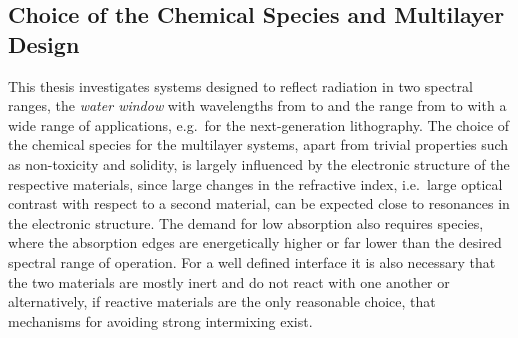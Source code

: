 \subsection{Choice of the Chemical Species and Multilayer Design}
\label{ch_exp:sec_multilayer_design}
This thesis investigates systems designed to reflect radiation in two spectral ranges, the \emph{water window} with wavelengths from  to  and the range from  to  with a wide range of applications, e.g.~for the next-generation lithography. The choice of the chemical species for the multilayer systems, apart from trivial properties such as non-toxicity and solidity, is largely influenced by the electronic structure of the respective materials, since large changes in the refractive index, i.e.~large optical contrast with respect to a second material, can be expected close to resonances in the electronic structure. The demand for low absorption also requires species, where the absorption edges are energetically higher or far lower than the desired spectral range of operation. For a well defined interface it is also necessary that the two materials are mostly inert and do not react with one another or alternatively, if reactive materials are the only reasonable choice, that mechanisms for avoiding strong intermixing exist.

